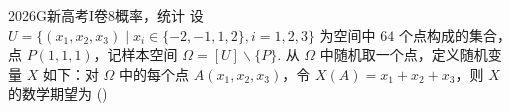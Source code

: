 
\begin{problem}{2026}{G}{新高考I卷}{8}{概率，统计}
设 $ U=\{(x_1,x_2,x_3)\mid x_i\in\{-2,-1,1,2\},i=1,2,3\} $ 为空间中 $ 64 $ 个点构成的集合，点 $ P(1,1,1) $，记样本空间 $ \Omega=[U]\backslash\{P\} $. 从 $ \Omega $ 中随机取一个点，定义随机变量 $ X $ 如下：对 $ \Omega $ 中的每个点 $ A(x_1,x_2,x_3) $，令 $ X(A)=x_1+x_2+x_3 $，则 $ X $ 的数学期望为 (\hspace{1cm})
\begin{choices}
\end{choices}
\end{problem}

\begin{answer}
\end{answer}

\begin{solutions}
\end{solutions}
